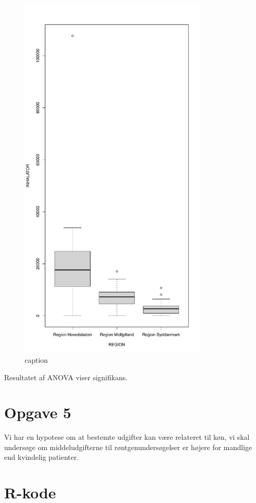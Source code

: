 \documentclass{article}
\begin{document}
\begin{figure}[H]
  \centering
  \includegraphics[width=0.8\textwidth]{./plots/anovaboxplot.pdf}
  \caption{caption}
\end{figure}

Resultatet af ANOVA viser signifikans.


\section{Opgave 5}

Vi har en hypotese om at bestemte udgifter kan være relateret til køn, vi skal
undersøge om middeludgifterne til røntgenundersøgelser er højere for mandlige
end kvindelig patienter.


\section{R-kode}

\end{document}
